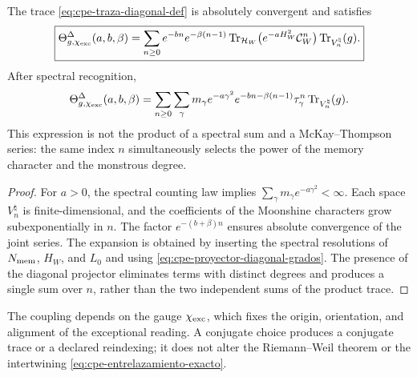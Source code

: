 \begin{theorem}
\label{thm:cpe-traza-diagonal}
The trace \eqref{eq:cpe-traza-diagonal-def} is absolutely convergent and
satisfies
\begin{equation}
 \boxed{\Theta^{\Delta}_{g,\chi_{\rm exc}}(a,b,\beta)
 =\sum_{n\ge0}e^{-bn}e^{-\beta(n-1)}
 \operatorname{Tr}_{\mathcal H_W}
 \bigl(e^{-aH_W^2}\mathcal C_W^n\bigr)
 \operatorname{Tr}_{V^\natural_n}(g).}
 \label{eq:cpe-traza-diagonal-expansion}
\end{equation}
After spectral recognition,
\begin{equation}
 \Theta^{\Delta}_{g,\chi_{\rm exc}}(a,b,\beta)
 =\sum_{n\ge0}\sum_\gamma
 m_\gamma e^{-a\gamma^2}
 e^{-bn-\beta(n-1)}\tau_\gamma^n
 \operatorname{Tr}_{V^\natural_n}(g).
 \label{eq:cpe-traza-diagonal-espectral}
\end{equation}
This expression is not the product of a spectral sum and a
McKay--Thompson series: the same index \(n\) simultaneously selects the power
of the memory character and the monstrous degree.
\end{theorem}

\begin{proof}
For \(a>0\), the spectral counting law implies
\(\sum_\gamma m_\gamma e^{-a\gamma^2}<\infty\). Each space
\(V^\natural_n\) is finite-dimensional, and the coefficients of the Moonshine
characters grow subexponentially in \(n\). The factor
\(e^{-(b+\beta)n}\) ensures absolute convergence of the joint series.
The expansion is obtained by inserting the spectral resolutions of
\(N_{\rm mem}\), \(H_W\), and \(L_0\) and using
\eqref{eq:cpe-proyector-diagonal-grados}. The presence of the diagonal projector
eliminates terms with distinct degrees and produces a single sum over
\(n\), rather than the two independent sums of the product trace.
\end{proof}

The coupling depends on the gauge \(\chi_{\rm exc}\), which fixes the origin,
orientation, and alignment of the exceptional reading. A conjugate choice
produces a conjugate trace or a declared reindexing; it does not alter the
Riemann--Weil theorem or the intertwining
\eqref{eq:cpe-entrelazamiento-exacto}.

